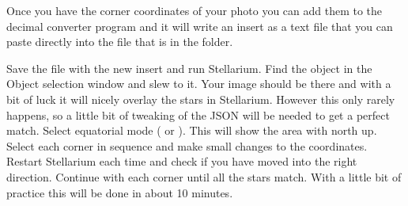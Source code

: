 Once you have the corner coordinates of your photo you can add them to
the decimal converter program and it will write an insert
 as a text file that you can paste directly into the
 file that is in the 
folder.

Save the  file with the new insert and run
Stellarium. Find the object in the  Object selection window and slew to
it. Your image should be there and with a bit of luck it will nicely
overlay the stars in Stellarium. However this only rarely
happens, so a little bit of tweaking of the JSON  will be
needed to get a perfect match. Select equatorial mode ( or ).
This will show the area with north up. Select each corner in sequence
and make small changes to the coordinates. Restart Stellarium each time
and check if you have moved into the right direction. Continue with each
corner until all the stars match. With a little bit of practice this
will be done in about 10 minutes.
\fi


